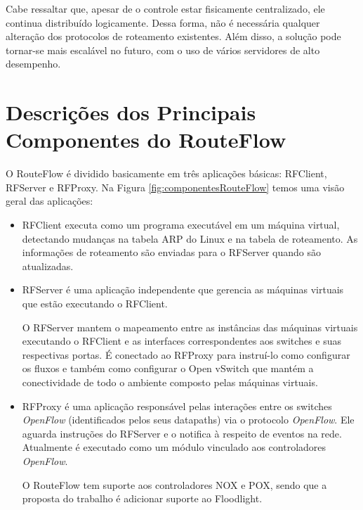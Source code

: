 Cabe ressaltar que, apesar de o controle estar fisicamente
centralizado, ele continua distribuído logicamente. Dessa
forma, não é necessária qualquer alteração dos protocolos de
roteamento existentes. Além disso, a solução pode tornar-se
mais escalável no futuro, com o uso
de vários servidores de alto desempenho.

\section{Descrições dos Principais Componentes do RouteFlow}
O RouteFlow é dividido basicamente em três aplicações
básicas: RFClient, RFServer e RFProxy. Na Figura
\ref{fig:componentesRouteFlow} temos uma visão geral das
aplicações:

\begin{itemize} 
\item RFClient executa como um programa
executável em um máquina virtual, detectando
mudanças na tabela ARP do Linux e na tabela de roteamento.
As informações de roteamento são enviadas para o
RFServer quando são atualizadas.
\item RFServer é uma aplicação independente que gerencia as
máquinas virtuais que estão executando o RFClient. 

O RFServer mantem o mapeamento entre as instâncias das
máquinas virtuais executando o RFClient e as interfaces
correspondentes aos switches e suas respectivas portas. É
conectado ao RFProxy para instruí-lo como configurar os
fluxos e também como configurar o Open vSwitch que mantém a
conectividade de todo o ambiente composto pelas máquinas virtuais.
\item RFProxy é uma aplicação responsável pelas interações
entre os switches \textit{OpenFlow} (identificados pelos seus
datapaths) via o protocolo \textit{OpenFlow}. Ele aguarda instruções
do RFServer e o notifica à respeito de eventos na rede.
Atualmente é executado como um módulo vinculado aos
controladores \textit{OpenFlow}. 

O RouteFlow tem suporte aos
controladores NOX e POX, sendo que a proposta do trabalho é
adicionar suporte ao Floodlight. 
\end{itemize}

